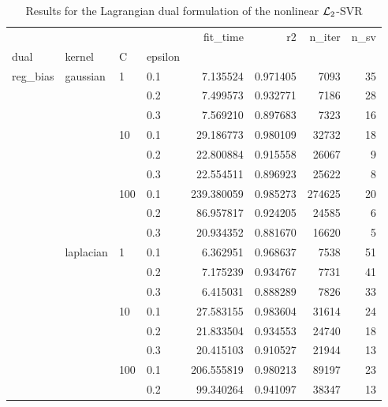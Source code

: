 \begin{table}[H]
\centering
\caption{Results for the Lagrangian dual formulation of the nonlinear $\protect \mathcal{L}_2$-SVR}
\label{nonlinear_lagrangian_dual_l2_svr_cv_results}
\begin{tabular}{llllrrrr}
\toprule
           &           &     &     &    fit\_time &        r2 &  n\_iter &  n\_sv \\
dual & kernel & C & epsilon &             &           &         &       \\
\midrule
reg\_bias & gaussian & 1   & 0.1 &    7.135524 &  0.971405 &    7093 &    35 \\
           &           &     & 0.2 &    7.499573 &  0.932771 &    7186 &    28 \\
           &           &     & 0.3 &    7.569210 &  0.897683 &    7323 &    16 \\
           &           & 10  & 0.1 &   29.186773 &  0.980109 &   32732 &    18 \\
           &           &     & 0.2 &   22.800884 &  0.915558 &   26067 &     9 \\
           &           &     & 0.3 &   22.554511 &  0.896923 &   25622 &     8 \\
           &           & 100 & 0.1 &  239.380059 &  0.985273 &  274625 &    20 \\
           &           &     & 0.2 &   86.957817 &  0.924205 &   24585 &     6 \\
           &           &     & 0.3 &   20.934352 &  0.881670 &   16620 &     5 \\
           & laplacian & 1   & 0.1 &    6.362951 &  0.968637 &    7538 &    51 \\
           &           &     & 0.2 &    7.175239 &  0.934767 &    7731 &    41 \\
           &           &     & 0.3 &    6.415031 &  0.888289 &    7826 &    33 \\
           &           & 10  & 0.1 &   27.583155 &  0.983604 &   31614 &    24 \\
           &           &     & 0.2 &   21.833504 &  0.934553 &   24740 &    18 \\
           &           &     & 0.3 &   20.415103 &  0.910527 &   21944 &    13 \\
           &           & 100 & 0.1 &  206.555819 &  0.980213 &   89197 &    23 \\
           &           &     & 0.2 &   99.340264 &  0.941097 &   38347 &    13 \\

\end{tabular}
\end{table}
